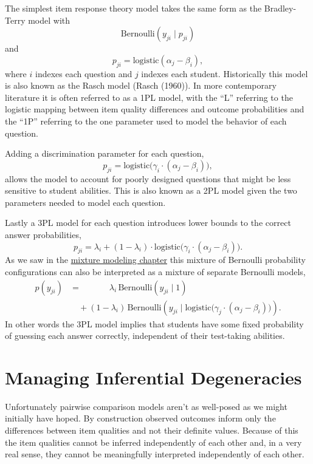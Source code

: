 \documentclass[
  letterpaper,
  DIV=11,
  numbers=noendperiod]{scrartcl}
\begin{document}
The simplest item response theory model takes the same form as the
Bradley-Terry model with \[
\text{Bernoulli}(y_{ji} \mid p_{ji})
\] and \[
p_{ji}
=
\mathrm{logistic}(\alpha_{j} - \beta_{i}),
\] where \(i\) indexes each question and \(j\) indexes each student.
Historically this model is also known as the Rasch model (Rasch (1960)).
In more contemporary literature it is often referred to as a 1PL model,
with the ``L'' referring to the logistic mapping between item quality
differences and outcome probabilities and the ``1P'' referring to the
one parameter used to model the behavior of each question.

Adding a discrimination parameter for each question, \[
p_{ji}
=
\mathrm{logistic}\big( \gamma_{i} \cdot (\alpha_{j} - \beta_{i} ) \big),
\] allows the model to account for poorly designed questions that might
be less sensitive to student abilities. This is also known as a 2PL
model given the two parameters needed to model each question.

Lastly a 3PL model for each question introduces lower bounds to the
correct answer probabilities, \[
p_{ji}
=
  \lambda_{i}
+ (1 - \lambda_{i}) \cdot
  \mathrm{logistic} \big(
    \gamma_{i} \cdot (\alpha_{j} - \beta_{i} )
  \big).
\] As we saw in the
\href{https://betanalpha.github.io/assets/chapters_html/mixture_modeling.html\#categorical-and-multinomial-mixture-models}{mixture
modeling chapter} this mixture of Bernoulli probability configurations
can also be interpreted as a mixture of separate Bernoulli models,
\begin{align*}
p(y_{ji})
&=
\quad\quad\quad\; \lambda_{i} \, \text{Bernoulli}(y_{ji} \mid 1)
\\
&\quad +
(1 - \lambda_{i}) \,
\text{Bernoulli}(y_{ji} \mid
  \mathrm{logistic}\big( \gamma_{j} \cdot
                         (\alpha_{j} - \beta_{i} ) \big)).
\end{align*} In other words the 3PL model implies that students have
some fixed probability of guessing each answer correctly, independent of
their test-taking abilities.

\section{Managing Inferential Degeneracies}\label{sec:inf-degen}

Unfortunately pairwise comparison models aren't as well-posed as we
might initially have hoped. By construction observed outcomes inform
only the differences between item qualities and not their definite
values. Because of this the item qualities cannot be inferred
independently of each other and, in a very real sense, they cannot be
meaningfully interpreted independently of each other.
\end{document}

